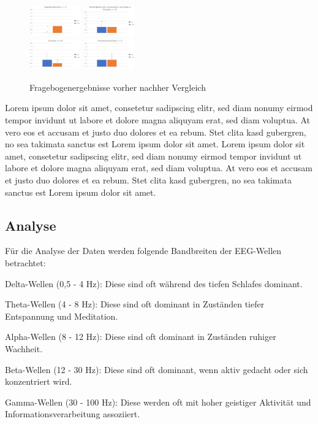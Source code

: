 \documentclass[conference]{IEEEtran}
\begin{document}
\begin{figure}[ht]
	\centering
	\includegraphics[width=0.2\textwidth]{assets/augenBesch.png} \hspace{-5pt}
	\includegraphics[width=0.2\textwidth]{assets/fokus.png} \\
	\vspace{2pt}
	\includegraphics[width=0.2\textwidth]{assets/schwitz.png} \hspace{-5pt}
	\includegraphics[width=0.2\textwidth]{assets/verschwSicht.png}
	\caption{Fragebogenergebnisse vorher nachher Vergleich}
	\label{fig:Fragebogenergebnisse}
\end{figure}
Lorem ipsum dolor sit amet, consetetur sadipscing elitr, sed diam nonumy eirmod tempor invidunt ut labore et dolore magna aliquyam erat, sed diam voluptua. At vero eos et accusam et justo duo dolores et ea rebum. Stet clita kasd gubergren, no sea takimata sanctus est Lorem ipsum dolor sit amet. Lorem ipsum dolor sit amet, consetetur sadipscing elitr, sed diam nonumy eirmod tempor invidunt ut labore et dolore magna aliquyam erat, sed diam voluptua. At vero eos et accusam et justo duo dolores et ea rebum. Stet clita kasd gubergren, no sea takimata sanctus est Lorem ipsum dolor sit amet.

\subsection{Analyse}
Für die Analyse der Daten werden folgende Bandbreiten der EEG-Wellen betrachtet:
\begin{myitemize}
    \item Delta-Wellen (0,5 - 4 Hz): Diese sind oft während des tiefen Schlafes dominant.
    \item Theta-Wellen (4 - 8 Hz): Diese sind oft dominant in Zuständen tiefer Entspannung und Meditation.
    \item Alpha-Wellen (8 - 12 Hz): Diese sind oft dominant in Zuständen ruhiger Wachheit.
    \item Beta-Wellen (12 - 30 Hz): Diese sind oft dominant, wenn aktiv gedacht oder sich konzentriert wird.
    \item Gamma-Wellen (30 - 100 Hz): Diese werden oft mit hoher geistiger Aktivität und Informationsverarbeitung assoziiert.
\end{myitemize}
\end{document}
